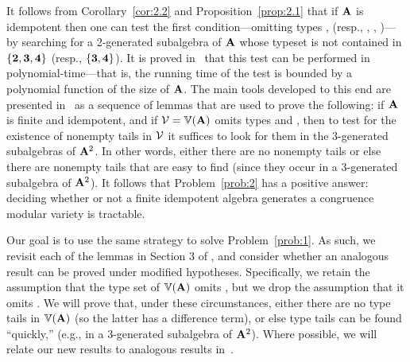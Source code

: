 It follows from Corollary~\ref{cor:2.2} and Proposition~\ref{prop:2.1}
that if $\mathbf{A}$ is idempotent then one can
test the first condition---omitting
types \utyp, \styp (resp., \utyp, \atyp, \styp)---by searching
for a 2-generated subalgebra of $\mathbf{A}$ whose typeset is
not contained in
$\{\textbf{2}, \textbf{3}, \textbf{4}\}$ (resp., $\{\textbf{3}, \textbf{4}\}$). It is proved
in~\cite[Section~6]{Freese:2009} that this
test can be performed in polynomial-time---that is, the running
time of the test is bounded by a polynomial function of the size of $\mathbf{A}$.
The main tools developed to this end are presented
in~\cite[Section~3]{Freese:2009} as a sequence of
lemmas that are used %
to prove the following:
if $\mathbf{A}$ is finite and idempotent, and if
$\mathcal V = \operatorname{\mathbb{V}}(\mathbf{A})$ omits types \utyp and \styp,
then to test for the existence of nonempty tails
in $\mathcal{V}$ it suffices to look for them
in the 3-generated subalgebras of $\mathbf{A}^2$.
In other words, either there are no nonempty tails
or else there are nonempty tails that are easy to find
(since they occur in a 3-generated subalgebra of $\mathbf{A}^2$).
It follows that Problem~\ref{prob:2} has a positive answer:
deciding whether or not a finite idempotent algebra generates a congruence
modular variety is tractable.%

Our goal is to use the same strategy to solve Problem~\ref{prob:1}.
As such, we revisit each of the lemmas in Section 3 of \cite{Freese:2009},
and consider whether an analogous result can be proved under
modified hypotheses.
Specifically, we retain the assumption that the type set of $\operatorname{\mathbb{V}}(\mathbf{A})$
omits \utyp, but we drop the assumption that it omits \styp.
We will  prove that, under these circumstances, %
either there are no type \atyp tails in $\operatorname{\mathbb{V}}(\mathbf{A})$ (so the latter has a difference term),
or else type \atyp tails can be found ``quickly,''
(e.g., in a 3-generated subalgebra of $\mathbf{A}^2$).
Where possible, we will relate our new results to
analogous results in~\cite{Freese:2009}.

